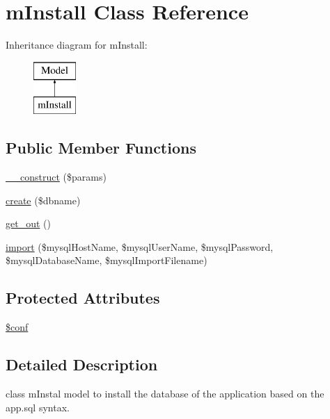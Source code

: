 \hypertarget{classmInstall}{}\section{m\+Install Class Reference}
\label{classmInstall}
Inheritance diagram for m\+Install\+:\begin{figure}[H]
\begin{center}
\leavevmode
\includegraphics[height=2.000000cm]{classmInstall}
\end{center}
\end{figure}
\subsection*{Public Member Functions}
\begin{DoxyCompactItemize}
\item 
\hyperlink{classmInstall_a229e5e04fbd8d1f65011b50b52a9befc}{\+\_\+\+\_\+construct} (\$params)
\item 
\hyperlink{classmInstall_acdaadb3239e705ac947c40f7c21b8217}{create} (\$dbname)
\item 
\hyperlink{classmInstall_a35b66150908fe450c5c965a2cf5a0834}{get\+\_\+out} ()
\item 
\hyperlink{classmInstall_ad960e44aba081537e16aa570446a12dc}{import} (\$mysql\+Host\+Name, \$mysql\+User\+Name, \$mysql\+Password, \$mysql\+Database\+Name, \$mysql\+Import\+Filename)
\end{DoxyCompactItemize}
\subsection*{Protected Attributes}
\begin{DoxyCompactItemize}
\item 
\hyperlink{classmInstall_adde2b54a22a6aaa56b40e5e4bdc0544e}{\$conf}
\end{DoxyCompactItemize}


\subsection{Detailed Description}
class m\+Instal model to install the database of the application based on the app.\+sql syntax.

